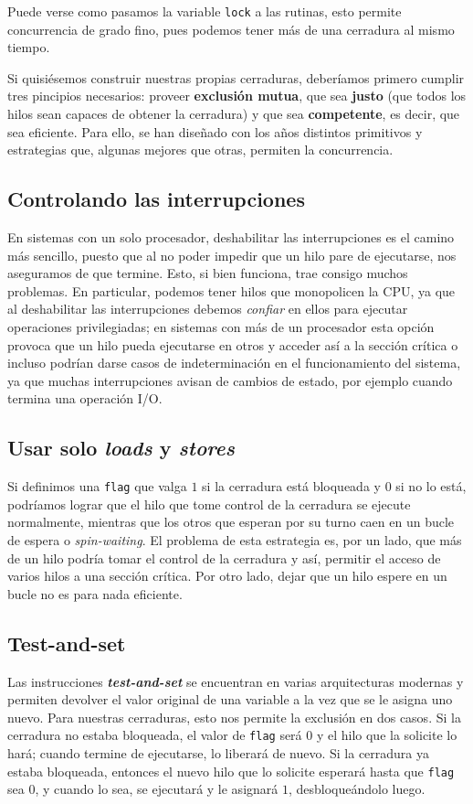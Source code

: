 \documentclass{article}
\begin{document}
	Puede verse como pasamos la variable \lstinline|lock| a las rutinas, esto permite concurrencia de grado fino, pues podemos tener más de una cerradura al mismo tiempo.
	
	Si quisiésemos construir nuestras propias cerraduras, deberíamos primero cumplir tres pincipios necesarios: proveer \textbf{exclusión mutua}, que sea \textbf{justo} (que todos los hilos sean capaces de obtener la cerradura) y que sea \textbf{competente}, es decir, que sea eficiente. Para ello, se han diseñado con los años distintos primitivos y estrategias que, algunas mejores que otras, permiten la concurrencia.
	
	\subsection{Controlando las interrupciones}
	En sistemas con un solo procesador,  deshabilitar las interrupciones es el camino más sencillo, puesto que al no poder impedir que un hilo pare de ejecutarse, nos aseguramos de que termine. Esto, si bien funciona, trae consigo muchos problemas. En particular, podemos tener hilos que monopolicen la CPU, ya que al deshabilitar las interrupciones debemos \textit{confiar} en ellos para ejecutar operaciones privilegiadas; en sistemas con más de un procesador esta opción provoca que un hilo pueda ejecutarse en otros y acceder así a la sección crítica o incluso podrían darse casos de indeterminación en el funcionamiento del sistema, ya que muchas interrupciones avisan de cambios de estado, por ejemplo cuando termina una operación I/O.
	
	\subsection{Usar solo \textit{loads} y \textit{stores}}
	Si definimos una \lstinline|flag| que valga $1$ si la cerradura está bloqueada y $0$ si no lo está, podríamos lograr que el hilo que tome control de la cerradura se ejecute normalmente, mientras que los otros que esperan por su turno caen en un bucle de espera o \textit{spin-waiting}. El problema de esta estrategia es, por un lado, que más de un hilo podría tomar el control de la cerradura y así, permitir el acceso de varios hilos a una sección crítica. Por otro lado, dejar que un hilo espere en un bucle no es para nada eficiente.
	
	\subsection{Test-and-set}
	Las instrucciones \textbf{\textit{test-and-set}} se encuentran en varias arquitecturas modernas y permiten devolver el valor original de una variable a la vez que se le asigna uno nuevo. Para nuestras cerraduras, esto nos permite la exclusión en dos casos. Si la cerradura no estaba bloqueada, el valor de \lstinline|flag| será $0$ y el hilo que la solicite lo hará; cuando termine de ejecutarse, lo liberará de nuevo. Si la cerradura ya estaba bloqueada, entonces el nuevo hilo que lo solicite esperará hasta que \lstinline|flag| sea $0$,  y cuando lo sea, se ejecutará y le asignará $1$, desbloqueándolo luego. \linebreak
	
\end{document}
